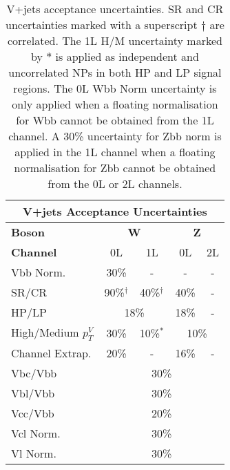 \begin{table}[!htbp] 
  \footnotesize\centering
  \setlength{\tabcolsep}{0.5em} %
  \begin{tabular}{l|c|c|c|c}
      \toprule\hline
      \multicolumn{5}{c}{V+jets Acceptance Uncertainties}            
      \\ \hline
      \textbf{Boson}      & \multicolumn{2}{c|}{\textbf{W}} & \multicolumn{2}{c}{\textbf{Z}} 
      \\ \hline
      \textbf{Channel}    & 0L          & 1L         & 0L         & 2L          
      \\ \hline
      Vbb Norm.           &   30\%      &     -      &     -      &          -  
      \\ \hline
      SR/CR               &   90\%$^\dagger$         & 40\%$^\dagger$ &      40\%     & -         
      \\ \hline
      HP/LP               & \multicolumn{2}{c|}{18\%}             &   18\%      & -         
      \\ \hline
      High/Medium $p_T^V$ &   30\%      & 10\%$^*$       & \multicolumn{2}{c}{10\%}          
      \\ \hline
      Channel Extrap.             &   20\%      &   -        &    16\%    & -
      \\ \hline
      Vbc/Vbb             & \multicolumn{4}{c}{30\%}                       
      \\ \hline
      Vbl/Vbb             & \multicolumn{4}{c}{30\%}                       
      \\ \hline
      Vcc/Vbb             & \multicolumn{4}{c}{20\%}                       
      \\ \hline
      Vcl Norm.           & \multicolumn{4}{c}{30\%}                       
      \\ \hline
      Vl Norm.            & \multicolumn{4}{c}{30\%}                       
      \\ \hline\bottomrule
  \end{tabular}
  \caption{ V+jets acceptance uncertainties. \Wjets SR and CR uncertainties marked with a superscript $\dagger$ are correlated.
  The 1L \Wjets H/M uncertainty marked by $*$ is applied as independent and uncorrelated NPs in both HP and LP signal regions.
  The 0L \Wjets Wbb Norm uncertainty is only applied when a floating normalisation for Wbb cannot be obtained from the 1L channel.
  A 30\% uncertainty for Zbb norm is applied in the 1L channel when a floating normalisation for Zbb cannot be obtained from the 0L or 2L channels. }
  \label{tab:Vjets acceptance uncerts}
\end{table}